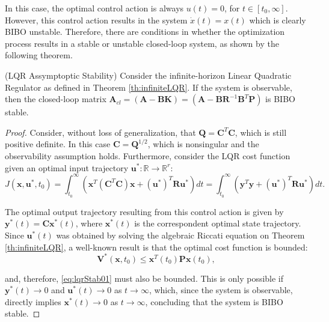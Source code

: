 \documentclass[a4paper,11pt]{book}
\numberwithin{figure}{chapter}
\numberwithin{equation}{chapter}
\numberwithin{table}{chapter}
\newtheorem{theorem}{Theorem}[chapter]
\theoremstyle{definition}
\newcounter{boxed-theorem}
\newenvironment{boxed-theorem}[1]
{\colorlet{shadecolor}{pastelBlue2!10} \begin{shaded} \begin{theorem}{#1}}
{\end{theorem} \end{shaded}}
\newcounter{boxed-definition}
\newcounter{boxed-example}
\begin{document}
In this case, the optimal control action is always $u(t) = 0$, for $t \in [t_0, \infty]$. However, this control action results in the system $\dot{x}(t) = x(t)$ which is clearly BIBO unstable. Therefore, there are conditions in whether the optimization process results in a stable or unstable closed-loop system, as shown by the following theorem.

\begin{boxed-theorem}{(LQR Assymptoptic Stability)} \label{th:lqrStab}
    Consider the infinite-horizon Linear Quadratic Regulator as defined in Theorem \ref{th:infiniteLQR}. If the system is observable, then the closed-loop matrix $\bm{A}_{cl} = (\bm{A} - \bm{B}\bm{K}) = (\bm{A} - \bm{B}\bm{R}^{-1}\bm{B}^T\bm{P})$ is BIBO stable.
\end{boxed-theorem}

\begin{proof}
    Consider, without loss of generalization, that $\bm{Q} = \bm{C}^T \bm{C}$, which is still positive definite. In this case $\bm{C} = \bm{Q}^{1/2}$, which is nonsingular and the observability assumption holds. Furthermore, consider the LQR cost function given an optimal input trajectory $\bm{u}^* : \mathbb{R} \rightarrow \mathbb{R}^r$:
    \begin{equation} \label{eq:lqrStab01}
    J(\bm{x},\bm{u}^*,t_0) = \int_{t_0}^{\infty} \left( \bm{x}^T (\bm{C}^T \bm{C}) \bm{x} + (\bm{u}^*)^T \bm{R} \bm{u}^* \right) dt = \int_{t_0}^{\infty} \left( \bm{y}^T \bm{y} + (\bm{u}^*)^T \bm{R} \bm{u}^* \right) dt
.\end{equation}

The optimal output trajectory resulting from this control action is given by $\bm{y}^*(t) = \bm{C} \bm{x}^*(t)$, where $\bm{x}^*(t)$ is the correspondent optimal state trajectory. Since $\bm{u}^*(t)$ was obtained by solving the algebraic Riccati equation on Theorem \ref{th:infiniteLQR}, a well-known result is that the optimal cost function is bounded:
\begin{equation}
    \bm{V}^*(\bm{x}, t_0) \leq \bm{x}^T(t_0) \bm{P} \bm{x}(t_0)
,\end{equation}

\noindent and, therefore, \eqref{eq:lqrStab01} must also be bounded. This is only possible if $\bm{y}^*(t) \to 0$ and $\bm{u}^*(t) \to 0$ as $t \to \infty$, which, since the system is observable, directly implies $\bm{x}^*(t) \to 0$ as $t \to \infty$, concluding that the system is BIBO stable.
\end{proof}
\end{document}
